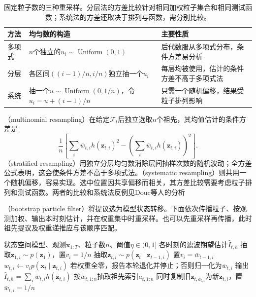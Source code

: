 \begin{table}[htbp]
  \centering
  \begin{tabularx}{\linewidth}{@{}lXX@{}}
    \toprule
    方法 & 均匀数的构造 & 主要性质\\
    \midrule
    多项式 & $n$个独立的$u_i\sim\operatorname{Uniform}(0,1)$ & 后代数服从多项式分布，条件方差易分析\\
    分层 & 各区间$((i-1)/n,i/n)$独立抽一个$u_i$ & 每层均被使用，估计的条件方差不高于多项式法\\
    系统 & 抽一个$u\sim\operatorname{Uniform}(0,1/n)$，令$u_i=u+(i-1)/n$ & 只需一个随机偏移，结果受粒子排列影响\\
    \bottomrule
  \end{tabularx}
  \caption{固定粒子数的三种重采样。分层法的方差比较针对相同加权粒子集合和相同测试函数；系统法的方差还取决于排列与函数，需分别比较。}
  \label{tab:pgm-sampling-resampling}
\end{table}

（multinomial resampling）在给定$\mathcal{F}_t$后独立选取$n$个祖先，其均值估计的条件方差是
\begin{equation}
  \frac1n\left[
    \sum_i\bar w_{t,i}h(\bm{z}_{t,i})^2
      -\left(\sum_i\bar w_{t,i}h(\bm{z}_{t,i})\right)^2
  \right].
  \label{eq:pgm-sampling-resampling-variance}
\end{equation}
（stratified resampling）用独立分层均匀数消除层间抽样次数的随机波动；全方差公式表明，这会使条件方差不高于多项式法。（systematic resampling）则共用一个随机偏移，容易实现。选中位置因共享偏移而相关，其方差比较需要考虑粒子排列和测试函数。两者的比较和系统法反例见Douc等人的分析

（bootstrap particle filter）将提议选为模型状态转移。下面依次传播粒子、按观测加权、输出本时刻估计，并在权重集中时重采样。也可以先重采样再传播，此时祖先提议及权重递推应与该顺序匹配。

\begin{algorithm}[带阈值重采样的自举粒子滤波]
  \label{alg:pgm-sampling-bootstrap}
  \begin{algorithmic}[1]
    \Require 状态空间模型、观测$\bm{x}_{1:T}$、粒子数$n$、阈值$\eta\in(0,1]$
    \Ensure 各时刻的滤波期望估计$\widehat I_{t,h}$
          \State 抽取$\bm{z}_{1,i}\sim p(\bm{z}_1)$，置$v_i=1/n$
        \Else
          \State 抽取$\bm{z}_{t,i}\sim p(\bm{z}_t\mid\bm{z}_{t-1,i})$
          \State 置$v_i=\bar w_{t-1,i}$
        \EndIf
        \State $w_{t,i}\gets v_i p(\bm{x}_t\mid\bm{z}_{t,i})$
      \EndFor
      \State 若权重全零，报告本轮退化并停止；否则归一化为$\bar w_{t,i}$
      \State 输出$\widehat I_{t,h}=\sum_i\bar w_{t,i}h(\bm{z}_{t,i})$
        \State 按$\bar w_{t,1:n}$抽取祖先索引$a_{t,1:n}$
        \State 同时复制旧$\bm{z}_{t,a_{t,i}}$为新$\bm{z}_{t,i}$，置$\bar w_{t,i}=1/n$
      \EndIf
    \EndFor
  \end{algorithmic}
\end{algorithm}

